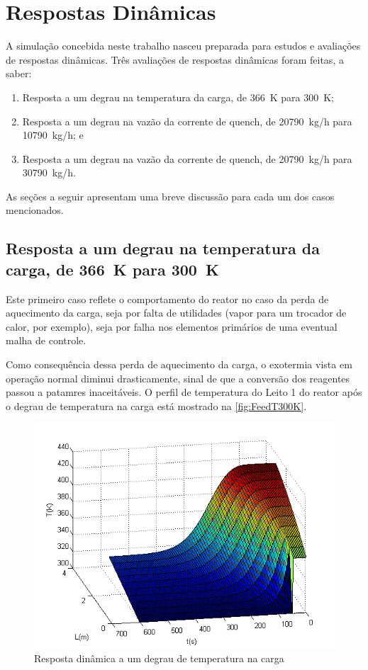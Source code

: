 \section{Respostas Dinâmicas} \label{sec:respostasdinamicas}

A simulação concebida neste trabalho nasceu preparada para estudos e avaliações
de respostas dinâmicas. Três avaliações de respostas dinâmicas foram feitas, a
saber:

\begin{enumerate}
  \item Resposta a um degrau na temperatura da carga, de \SI{366}{K} para
  \SI{300}{K};
  \item Resposta a um degrau na vazão da corrente de quench, de \SI{20790}{kg/h}
  para \SI{10790}{kg/h}; e
  \item Resposta a um degrau na vazão da corrente de quench, de \SI{20790}{kg/h}
  para \SI{30790}{kg/h}.
\end{enumerate}

As seções a seguir apresentam uma breve discussão para cada um dos casos
mencionados.

\subsection{Resposta a um degrau na temperatura da carga, de \SI{366}{K} para
\SI{300}{K}}
\label{sec:respostaaumdegrautemp}

Este primeiro caso reflete o comportamento do reator no caso da perda de
aquecimento da carga, seja por falta de utilidades (vapor para um trocador de
calor, por exemplo), seja por falha nos elementos primários de uma eventual
malha de controle.

Como consequência dessa perda de aquecimento da carga, o exotermia vista
em operação normal diminui drasticamente, sinal de que a conversão dos reagentes
passou a patamres inaceitáveis. O perfil de temperatura do Leito 1 do reator
após o degrau de temperatura na carga está mostrado na
\autoref{fig:FeedT300K}.

\begin{figure}[htb]
\centering
\includegraphics[scale=0.8]{images/Chap4/FeedT300K.png}
\caption{Resposta dinâmica a um degrau de temperatura na carga}
\label{fig:FeedT300K}
\end{figure}

